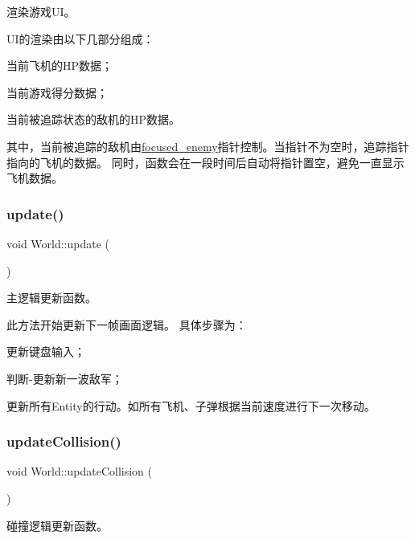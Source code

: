 渲染游戏\+U\+I。 

U\+I的渲染由以下几部分组成：
\begin{DoxyEnumerate}
\item 当前飞机的\+H\+P数据；
\item 当前游戏得分数据；
\item 当前被追踪状态的敌机的\+H\+P数据。
\end{DoxyEnumerate}

其中，当前被追踪的敌机由\hyperlink{class_world_ac8553c1be4fb1e79e94bf9f63f834963}{focused\+\_\+enemy}指针控制。当指针不为空时，追踪指针指向的飞机的数据。 同时，函数会在一段时间后自动将指针置空，避免一直显示飞机数据。 \mbox{\label{class_world_aac8c1fde63c06577ffc648aaefdb37f0}} 
\subsubsection{\texorpdfstring{update()}{update()}}
{\footnotesize\ttfamily void World\+::update (\begin{DoxyParamCaption}{ }\end{DoxyParamCaption})}



主逻辑更新函数。 

此方法开始更新下一帧画面逻辑。 具体步骤为：
\begin{DoxyEnumerate}
\item 更新键盘输入；
\item 判断-\/更新新一波敌军；
\item 更新所有\+Entity的行动。如所有飞机、子弹根据当前速度进行下一次移动。 
\end{DoxyEnumerate}\mbox{\label{class_world_ab86ffcea335fe909467eb754edc5f1a5}} 
\subsubsection{\texorpdfstring{update\+Collision()}{updateCollision()}}
{\footnotesize\ttfamily void World\+::update\+Collision (\begin{DoxyParamCaption}{ }\end{DoxyParamCaption})}



碰撞逻辑更新函数。 

